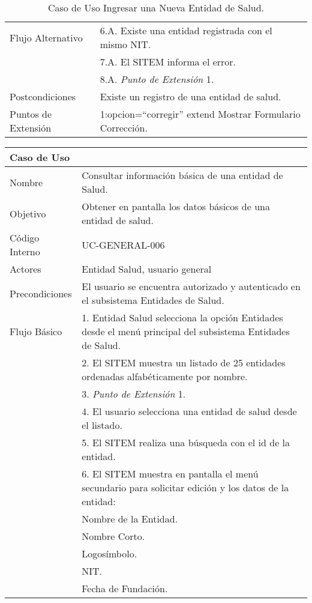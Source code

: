 \begin{table}
\begin{center}
\begin{tabular}{|l|p{10cm}|}
\hline
Flujo Alternativo & 6.A. Existe una entidad registrada con el mismo NIT. \\
& 7.A. El SITEM informa el error.\\
& 8.A. \textit{Punto de Extensión} 1.\\
\hline
Postcondiciones & Existe un registro de una entidad de salud.\\
\hline
Puntos de Extensión & 1:opcion=“corregir” extend Mostrar Formulario Corrección.\\
\hline
\end{tabular}
\caption{Caso de Uso Ingresar una Nueva Entidad de Salud.}
\label{casouso5} 
\end{center}
\end{table}

\begin{table}
\begin{center}
\begin{tabular}{|l|p{10cm}|}
\hline
\textbf{Caso de Uso}&\\
\hline
Nombre & Consultar información básica de una entidad de Salud.\\
\hline
Objetivo & Obtener en pantalla los datos básicos de una entidad de salud.\\
\hline
Código Interno & UC-GENERAL-006 \\
\hline
Actores & Entidad Salud, usuario general\\
\hline
Precondiciones & El usuario se encuentra autorizado y autenticado en el subsistema Entidades de Salud.\\
\hline
Flujo Básico & 1. Entidad Salud selecciona la opción Entidades desde el menú principal del subsistema Entidades de Salud.\\
& 2. El SITEM muestra un listado de 25 entidades ordenadas alfabéticamente por nombre.\\
& 3. \textit{Punto de Extensión} 1.\\
& 4. El usuario selecciona una entidad de salud desde el listado.\\
& 5. El SITEM realiza una búsqueda con el id de la entidad.\\
& 6. El SITEM muestra en pantalla el menú secundario para solicitar edición y los datos de la entidad:\\
& Nombre de la Entidad.\\
&Nombre Corto.\\
&Logosímbolo.\\
&NIT.\\
&Fecha de Fundación.\\

\end{tabular}
\end{center}
\end{table}
